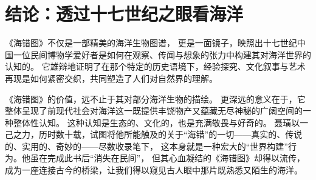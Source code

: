 \documentclass{source/Paper}
\begin{document}
\section{结论：透过十七世纪之眼看海洋}
《海错图》不仅是一部精美的海洋生物图谱，
更是一面镜子，映照出十七世纪中国一位民间博物学爱好者是如何在观察、传闻与想象的张力中构建其对海洋世界的认知的。
它雄辩地证明了在那个特定的历史语境下，经验探究、文化叙事与艺术再现是如何紧密交织，共同塑造了人们对自然界的理解。

《海错图》的价值，远不止于其对部分海洋生物的描绘。
更深远的意义在于，它整体呈现了前现代社会对海洋这一既提供丰饶物产又蕴藏无尽神秘的广阔空间的一种整体性认知。
这种认知是生态的、文化的，也是充满敬畏与好奇的。
聂璜以一己之力，历时数十载，试图将他所能触及的关于“海错”的一切——真实的、传说的、实用的、奇妙的——尽数收录笔下，
这本身就是一种宏大的“世界构建”行为。他虽在完成此书后“消失在民间”，
但其心血凝结的《海错图》却得以流传，成为一座连接古今的桥梁，让我们得以窥见古人眼中那片既熟悉又陌生的海洋。
\end{document}
